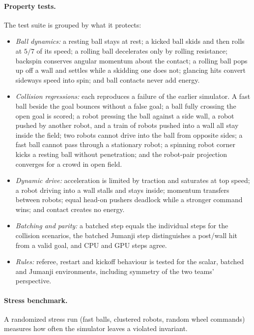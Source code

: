 \paragraph{Property tests.}
The test suite is grouped by what it protects:
\begin{itemize}
  \item \emph{Ball dynamics:} a resting ball stays at rest; a kicked ball skids and then rolls at $5/7$ of
        its speed; a rolling ball decelerates only by rolling resistance; backspin conserves angular
        momentum about the contact; a rolling ball pops up off a wall and settles while a skidding one does
        not; glancing hits convert sideways speed into spin; and ball contacts never add energy.
  \item \emph{Collision regressions:} each reproduces a failure of the earlier simulator.  A fast ball
        beside the goal bounces without a false goal; a ball fully crossing the open goal is scored; a robot
        pressing the ball against a side wall, a robot pushed by another robot, and a train of robots pushed
        into a wall all stay inside the field; two robots cannot drive into the ball from opposite sides;
        a fast ball cannot pass through a stationary robot; a spinning robot corner kicks a resting ball without
        penetration; and the robot-pair projection converges for a crowd in open field.
  \item \emph{Dynamic drive:} acceleration is limited by traction and saturates at top speed; a robot driving
        into a wall stalls and stays inside; momentum transfers between robots; equal head-on pushers deadlock
        while a stronger command wins; and contact creates no energy.
  \item \emph{Batching and parity:} a batched step equals the individual steps for the collision scenarios,
        the batched Jumanji step distinguishes a post/wall hit from a valid goal, and CPU and GPU steps agree.
  \item \emph{Rules:} referee, restart and kickoff behaviour is tested for the scalar, batched and Jumanji
        environments, including symmetry of the two teams' perspective.
\end{itemize}

\paragraph{Stress benchmark.}
A randomized stress run (fast balls, clustered robots, random wheel commands) measures how often the
simulator leaves a violated invariant.  %

